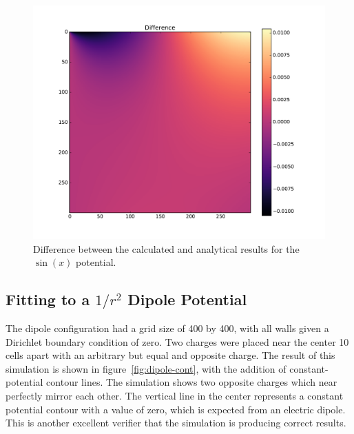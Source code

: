 	\begin{figure}[h]
	\centering
	\includegraphics[width=1.1\linewidth]{sin300_diff.pdf}
	\caption{Difference between the calculated and analytical results for the $\sin(x)$ potential.}
	\label{fig:sin-difference}
	\end{figure}

\subsection{Fitting to a $1/r^2$ Dipole Potential}

The dipole configuration had a grid size of 400 by 400, with all walls given a Dirichlet boundary condition
of zero. Two charges were placed near the center 10 cells apart with an arbitrary but equal and opposite charge.
The result of this simulation is shown in figure~\ref{fig:dipole-cont}, with the addition of constant-potential
contour lines. The simulation shows two opposite charges which near perfectly mirror each other. The vertical
line in the center represents a constant potential contour with a value of zero, which is expected from an
electric dipole. This is another excellent verifier that the simulation is producing correct results.

